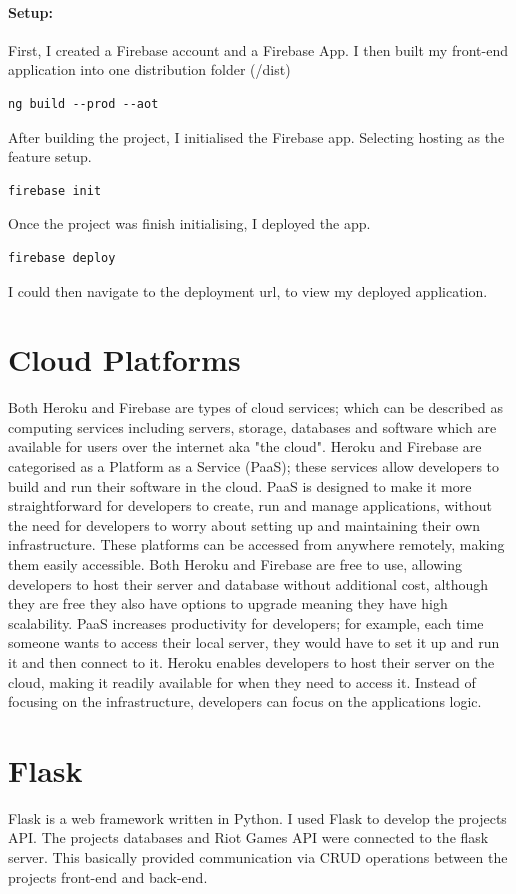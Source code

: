 \paragraph{Setup:}
First, I created a Firebase account and a Firebase App.
I then built my front-end application into one distribution folder (/dist)
\begin{verbatim}
ng build --prod --aot
\end{verbatim}
After building the project, I initialised the Firebase app.
Selecting hosting as the feature setup.
\begin{verbatim}
firebase init
\end{verbatim}
Once the project was finish initialising, I deployed the app.
\begin{verbatim}
firebase deploy
\end{verbatim}
I could then navigate to the deployment url, to view my deployed application.
\section{Cloud Platforms}
Both Heroku and Firebase are types of cloud services;  which can be described as computing services including servers, storage, databases and software which are available for users over the internet aka "the cloud".
Heroku and Firebase are categorised as a Platform as a Service (PaaS); these services allow developers to build and run their software in the cloud. 
PaaS is designed to make it more straightforward for developers to create, run and manage applications, without the need for developers to worry about setting up and maintaining their own infrastructure. These platforms can be accessed from anywhere remotely, making them easily accessible. Both Heroku and Firebase are free to use, allowing developers to host their server and database without additional cost, although they are free they also have options to upgrade meaning they have high scalability. PaaS increases productivity for developers; for example, each time someone wants to access their local server, they would have to set it up and run it and then connect to it. Heroku enables developers to host their server on the cloud, making it readily available for when they need to access it. Instead of focusing on the infrastructure, developers can focus on the applications logic.
\section{Flask}
Flask is a web framework written in Python. I used Flask to develop the projects API. The projects databases and Riot Games API were connected to the flask server. This basically provided communication via CRUD operations between the projects front-end and back-end.
